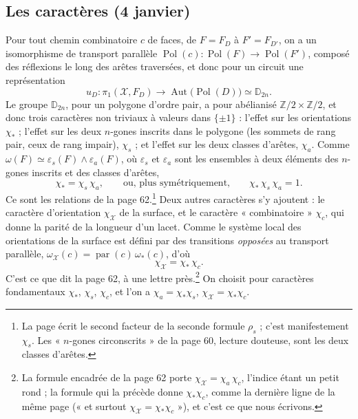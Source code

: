 \documentclass[11pt,a4paper]{article}
\begin{document}
\subsection*{Les caractères (4 janvier)}

Pour tout chemin combinatoire $c$ de faces, de $F = F_D$ à $F' = F_{D'}$, on a
un isomorphisme de transport parallèle $\operatorname{Pol}(c) :
\operatorname{Pol}(F) \to \operatorname{Pol}(F')$, composé des réflexions le long
des arêtes traversées, et donc pour un circuit une représentation
\[
u_D : \pi_1(\mathcal{X}, F_D) \longrightarrow \operatorname{Aut}\bigl(
\operatorname{Pol}(D) \bigr) \simeq \mathbb{D}_{2n} .
\]
Le groupe $\mathbb{D}_{2n}$, pour un polygone d'ordre pair, a pour abélianisé
$\mathbb{Z}/2 \times \mathbb{Z}/2$, et donc trois caractères non triviaux à
valeurs dans $\lbrace \pm 1 \rbrace$ : l'effet sur les orientations
$\chi_{\ast}$ ; l'effet sur les deux $n$-gones inscrits dans le polygone (les
sommets de rang pair, ceux de rang impair), $\chi_s$ ; et l'effet sur les deux
classes d'arêtes, $\chi_a$. Comme $\omega(F) \simeq \varepsilon_s(F) \wedge
\varepsilon_a(F)$, où $\varepsilon_s$ et $\varepsilon_a$ sont les ensembles à
deux éléments des $n$-gones inscrits et des classes d'arêtes,
\[
\chi_{\ast} = \chi_s\,\chi_a, \qquad \text{ou, plus symétriquement,} \qquad
\chi_{\ast}\,\chi_s\,\chi_a = 1 .
\]
Ce sont les relations de la page 62.\footnote{La page écrit le second facteur
de la seconde formule $\rho_s$ ; c'est manifestement $\chi_s$. Les « $n$-gones
circonscrits » de la page 60, lecture douteuse, sont les deux classes
d'arêtes.} Deux autres caractères s'y ajoutent : le caractère d'orientation $\chi_{\mathcal{X}}$ de la surface, et
le caractère « combinatoire » $\chi_c$, qui donne la parité de la longueur d'un
lacet. Comme le système local des orientations de la surface est défini par des
transitions \emph{opposées} au transport parallèle, $\omega_{\mathcal{X}}(c) =
\operatorname{par}(c)\,\omega_{\ast}(c)$, d'où
\[
\chi_{\mathcal{X}} = \chi_{\ast}\,\chi_c .
\]
C'est ce que dit la page 62, à une lettre près.\footnote{La formule encadrée de
la page 62 porte $\chi_{\mathcal{X}} = \chi_a\,\chi_c$, l'indice étant un petit
rond ; la formule qui la précède donne $\chi_{\ast}\chi_c$, comme la dernière
ligne de la même page (« et surtout $\chi_{\mathcal{X}} = \chi_{\ast}\chi_c$ »),
et c'est ce que nous écrivons.} On choisit pour caractères fondamentaux $\chi_{\ast}$, $\chi_s$, $\chi_c$, et
l'on a $\chi_a = \chi_{\ast}\chi_s$, $\chi_{\mathcal{X}} = \chi_{\ast}\chi_c$.
\end{document}
